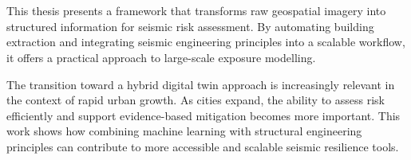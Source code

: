 \section{\sectionnametext}

This thesis presents a framework that transforms raw geospatial imagery into structured information for seismic risk assessment. By automating building extraction and integrating seismic engineering principles into a scalable workflow, it offers a practical approach to large-scale exposure modelling.

The transition toward a hybrid digital twin approach is increasingly relevant in the context of rapid urban growth. As cities expand, the ability to assess risk efficiently and support evidence-based mitigation becomes more important. This work shows how combining machine learning with structural engineering principles can contribute to more accessible and scalable seismic resilience tools.
